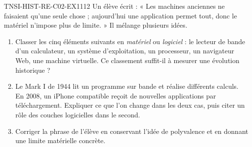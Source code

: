 

\begin{exercice}{TNSI-HIST-RE-C02-EX1}{1}{12}
Un élève écrit : « Les machines anciennes ne faisaient qu'une seule chose ; aujourd'hui une application permet tout, donc le matériel n'impose plus de limite. » Il mélange plusieurs idées.
\begin{enumerate}
  \item Classer les cinq éléments suivants en \emph{matériel} ou \emph{logiciel} : le lecteur de bande d'un calculateur, un système d'exploitation, un processeur, un navigateur Web, une machine virtuelle. Ce classement suffit-il à mesurer une évolution historique ?
  \item Le Mark I de 1944 lit un programme sur bande et réalise différents calculs. En 2008, un iPhone compatible reçoit de nouvelles applications par téléchargement. Expliquer ce que l'on change dans les deux cas, puis citer un rôle des couches logicielles dans le second.
  \item Corriger la phrase de l'élève en conservant l'idée de polyvalence et en donnant une limite matérielle concrète.
\end{enumerate}
\end{exercice}

